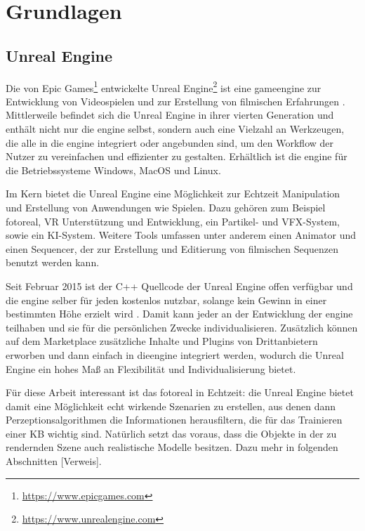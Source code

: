 \graphicspath{{./images/}}      
\def\CHAPTERONE{./chapters/Chapter-1} 

\chapter{Grundlagen}
\label{chap:software}
%	

\section{Unreal Engine}
\label{sec:unrealengine}
Die von Epic Games\footnote{\url{https://www.epicgames.com}} entwickelte Unreal Engine\footnote{\url{https://www.unrealengine.com}} ist eine \gls{gameengine} zur Entwicklung von Videospielen und zur Erstellung von filmischen Erfahrungen \cite{featUnreal}. Mittlerweile befindet sich die Unreal Engine in ihrer vierten Generation und enthält nicht nur die \acrshort{engine} selbst, sondern auch eine Vielzahl an Werkzeugen, die alle in die \acrshort{engine} integriert oder angebunden sind, um den Workflow der Nutzer zu vereinfachen und effizienter zu gestalten. Erhältlich ist die \acrshort{engine} für die Betriebssysteme Windows, MacOS und Linux. \par

Im Kern bietet die Unreal Engine eine Möglichkeit zur Echtzeit Manipulation und Erstellung von Anwendungen wie Spielen. Dazu gehören zum Beispiel \gls{fotoreal}, VR Unterstützung und Entwicklung, ein Partikel- und VFX-System, sowie ein KI-System. Weitere Tools umfassen unter anderem einen Animator und einen Sequencer, der zur Erstellung und Editierung von filmischen Sequenzen benutzt werden kann. \par 

Seit Februar 2015 ist der C++ Quellcode der Unreal Engine offen verfügbar und die \acrshort{engine} selber für jeden kostenlos nutzbar, solange kein Gewinn in einer bestimmten Höhe erzielt wird \cite{freeUnreal}. Damit kann jeder an der Entwicklung der \acrshort{engine} teilhaben und sie für die persönlichen Zwecke individualisieren. Zusätzlich können auf dem Marketplace zusätzliche Inhalte und Plugins von Drittanbietern erworben und dann einfach in die\acrshort{engine} integriert werden, wodurch die Unreal Engine ein hohes Maß an Flexibilität und Individualisierung bietet. \par 

Für diese Arbeit interessant ist das \gls{fotoreal} in Echtzeit: die Unreal Engine bietet damit eine Möglichkeit echt wirkende Szenarien zu erstellen, aus denen dann Perzeptionsalgorithmen die Informationen herausfiltern, die für das Trainieren einer KB wichtig sind. Natürlich setzt das voraus, dass die Objekte in der zu rendernden Szene auch realistische Modelle besitzen. Dazu mehr in folgenden Abschnitten [Verweis].       


